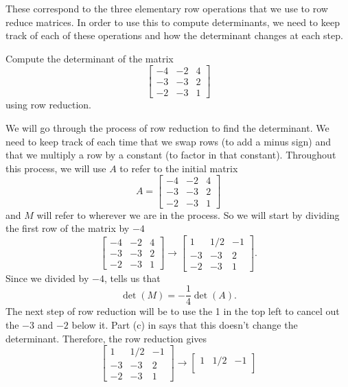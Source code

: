 These correspond to the three elementary row operations that we use to row reduce matrices. In order to use this to compute determinants, we need to keep track of each of these operations and how the determinant changes at each step. 

\begin{example}
Compute the determinant of the matrix
\[ \begin{bmatrix}  -4  & -2 & 4\\
 -3 & -3  & 2\\
 -2 &-3 & 1\end{bmatrix} \]
using row reduction. 
\end{example}

\begin{exampleSol}
We will go through the process of row reduction to find the determinant. We need to keep track of each time that we swap rows (to add a minus sign) and that we multiply a row by a constant (to factor in that constant). Throughout this process, we will use $A$ to refer to the initial matrix
\[ A = \begin{bmatrix}  -4  & -2 & 4\\
 -3 & -3  & 2\\
 -2 &-3 & 1\end{bmatrix} \] and $M$ will refer to wherever we are in the process. So we will start by dividing the first row of the matrix by $-4$
 \[ \begin{bmatrix}  -4  & -2 & 4\\
 -3 & -3  & 2\\
 -2 &-3 & 1\end{bmatrix}  \rightarrow \begin{bmatrix}  1  & 1/2 & -1\\
 -3 & -3  & 2\\
 -2 &-3 & 1\end{bmatrix}. \] Since we divided by $-4$,  tells us that
 \[ \det(M) = -\frac{1}{4} \det(A). \]
The next step of row reduction will be to use the 1 in the top left to cancel out the $-3$ and $-2$ below it. Part (c) in  says that this doesn't change the determinant. Therefore, the row reduction gives
\[ \begin{bmatrix}  1  & 1/2 & -1\\
 -3 & -3  & 2\\
 -2 &-3 & 1\end{bmatrix} \rightarrow \begin{bmatrix}  1  & 1/2 & -1\\

\end{bmatrix}\]
\end{exampleSol}
